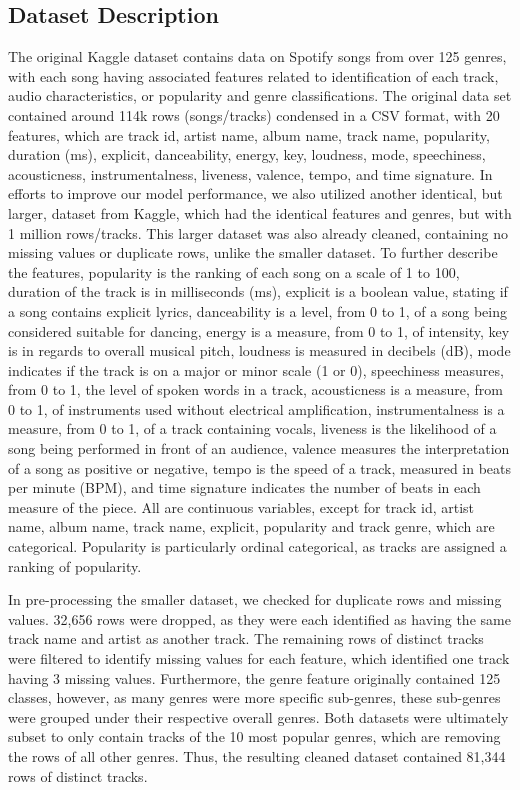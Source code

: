 \documentclass[times, twocolumn]{article}
\begin{document}
\subsection{Dataset Description}
The original Kaggle dataset contains data on Spotify songs from over 125 genres, with each song having associated features related to identification of each track, audio characteristics, or popularity and genre classifications. The original data set contained around 114k rows (songs/tracks) condensed in a CSV format, with 20 features, which are track id, artist name, album name, track name, popularity, duration (ms), explicit, danceability, energy, key, loudness, mode, speechiness, acousticness, instrumentalness, liveness, valence, tempo, and time signature. In efforts to improve our model performance, we also utilized another identical, but larger, dataset from Kaggle, which had the identical features and genres, but with 1 million rows/tracks. This larger dataset was also already cleaned, containing no missing values or duplicate rows, unlike the smaller dataset. To further describe the features, popularity is the ranking of each song on a scale of 1 to 100, duration of the track is in milliseconds (ms), explicit is a boolean value, stating if a song contains explicit lyrics, danceability is a level, from 0 to 1, of a song being considered suitable for dancing, energy is a measure, from 0 to 1, of intensity, key is in regards to overall musical pitch, loudness is measured in decibels (dB), mode indicates if the track is on a major or minor scale (1 or 0), speechiness measures, from 0 to 1, the level of spoken words in a track, acousticness is a measure, from 0 to 1, of instruments used without electrical amplification, instrumentalness is a measure, from 0 to 1, of a track containing vocals, liveness is the likelihood of a song being performed in front of an audience, valence measures the interpretation of a song as positive or negative, tempo is the speed of a track, measured in beats per minute (BPM), and time signature indicates the number of beats in each measure of the piece. All are continuous variables, except for track id, artist name, album name, track name, explicit, popularity and track genre, which are categorical. Popularity is particularly ordinal categorical, as tracks are assigned a ranking of popularity. 

In pre-processing the smaller dataset, we checked for duplicate rows and missing values. 32,656 rows were dropped, as they were each identified as having the same track name and artist as another track. The remaining rows of distinct tracks were filtered to identify missing values for each feature, which identified one track having 3 missing values. Furthermore, the genre feature originally contained 125 classes, however, as many genres were more specific sub-genres, these sub-genres were grouped under their respective overall genres. Both datasets were ultimately subset to only contain tracks of the 10 most popular genres, which are  removing the rows of all other genres. Thus, the resulting cleaned dataset contained 81,344 rows of distinct tracks.
\end{document}
